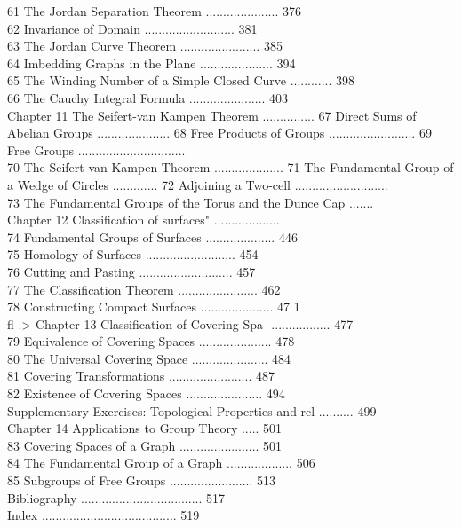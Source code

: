 61 The Jordan Separation Theorem ..................... 376 \\
62 Invariance of Domain .......................... 381 \\
63 The Jordan Curve Theorem ....................... 385 \\
64 Imbedding Graphs in the Plane ..................... 394 \\
65 The Winding Number of a Simple Closed Curve ............ 398 \\
66 The Cauchy Integral Formula ...................... 403 \\
Chapter 11 The Seifert-van Kampen Theorem ...............
67 Direct Sums of Abelian Groups .....................
68 Free Products of Groups .........................
69 Free Groups ............................... \\
70 The Seifert-van Kampen Theorem ....................
71 The Fundamental Group of a Wedge of Circles .............
72 Adjoining a Two-cell ........................... \\
73 The Fundamental Groups of the Torus and the Dunce Cap .......  \\
Chapter 12 Classification of surfaces" ................... \\
74 Fundamental Groups of Surfaces .................... 446 \\
75 Homology of Surfaces .......................... 454 \\
76 Cutting and Pasting ........................... 457 \\
77 The Classification Theorem ....................... 462 \\
78 Constructing Compact Surfaces ..................... 47 1 \\
fl .> Chapter 13 Classification of Covering Spa- ................. 477 \\
79 Equivalence of Covering Spaces ..................... 478 \\
80 The Universal Covering Space ...................... 484 \\
81 Covering Transformations ........................ 487 \\
82 Existence of Covering Spaces ...................... 494 \\
Supplementary Exercises: Topological Properties and rcl .......... 499 \\
Chapter 14 Applications to Group Theory ..... 501 \\
83 Covering Spaces of a Graph ....................... 501 \\
84 The Fundamental Group of a Graph ................... 506 \\
85 Subgroups of Free Groups ........................ 513 \\
Bibliography ................................... 517 \\
Index ....................................... 519 \\


